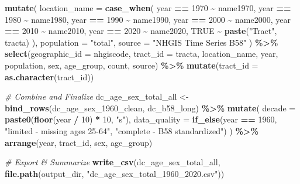 \documentclass[
]{article}
\newenvironment{Shaded}{\begin{snugshade}}{\end{snugshade}}
\newcommand{\AttributeTok}[1]{\textcolor[rgb]{0.13,0.29,0.53}{#1}}
\newcommand{\CommentTok}[1]{\textcolor[rgb]{0.56,0.35,0.01}{\textit{#1}}}
\newcommand{\ConstantTok}[1]{\textcolor[rgb]{0.56,0.35,0.01}{#1}}
\newcommand{\DecValTok}[1]{\textcolor[rgb]{0.00,0.00,0.81}{#1}}
\newcommand{\FunctionTok}[1]{\textcolor[rgb]{0.13,0.29,0.53}{\textbf{#1}}}
\newcommand{\NormalTok}[1]{#1}
\newcommand{\OtherTok}[1]{\textcolor[rgb]{0.56,0.35,0.01}{#1}}
\newcommand{\SpecialCharTok}[1]{\textcolor[rgb]{0.81,0.36,0.00}{\textbf{#1}}}
\newcommand{\StringTok}[1]{\textcolor[rgb]{0.31,0.60,0.02}{#1}}
\begin{document}
\begin{Shaded}
\begin{Highlighting}[]
  \FunctionTok{mutate}\NormalTok{(}
    \AttributeTok{location\_name =} \FunctionTok{case\_when}\NormalTok{(}
\NormalTok{      year }\SpecialCharTok{==} \DecValTok{1970} \SpecialCharTok{\textasciitilde{}}\NormalTok{ name1970,}
\NormalTok{      year }\SpecialCharTok{==} \DecValTok{1980} \SpecialCharTok{\textasciitilde{}}\NormalTok{ name1980,}
\NormalTok{      year }\SpecialCharTok{==} \DecValTok{1990} \SpecialCharTok{\textasciitilde{}}\NormalTok{ name1990,}
\NormalTok{      year }\SpecialCharTok{==} \DecValTok{2000} \SpecialCharTok{\textasciitilde{}}\NormalTok{ name2000,}
\NormalTok{      year }\SpecialCharTok{==} \DecValTok{2010} \SpecialCharTok{\textasciitilde{}}\NormalTok{ name2010,}
\NormalTok{      year }\SpecialCharTok{==} \DecValTok{2020} \SpecialCharTok{\textasciitilde{}}\NormalTok{ name2020,}
      \ConstantTok{TRUE} \SpecialCharTok{\textasciitilde{}} \FunctionTok{paste}\NormalTok{(}\StringTok{"Tract"}\NormalTok{, tracta)}
\NormalTok{    ),}
    \AttributeTok{population =} \StringTok{"total"}\NormalTok{,}
    \AttributeTok{source =} \StringTok{"NHGIS Time Series B58"}
\NormalTok{  ) }\SpecialCharTok{\%\textgreater{}\%}
  \FunctionTok{select}\NormalTok{(}\AttributeTok{geographic\_id =}\NormalTok{ nhgiscode, }\AttributeTok{tract\_id =}\NormalTok{ tracta, location\_name, year, population, sex, age\_group, count, source) }\SpecialCharTok{\%\textgreater{}\%}
  \FunctionTok{mutate}\NormalTok{(}\AttributeTok{tract\_id =} \FunctionTok{as.character}\NormalTok{(tract\_id))}

\CommentTok{\# Combine and Finalize }
\NormalTok{dc\_age\_sex\_total\_all }\OtherTok{\textless{}{-}} \FunctionTok{bind\_rows}\NormalTok{(dc\_age\_sex\_1960\_clean, dc\_b58\_long) }\SpecialCharTok{\%\textgreater{}\%}
  \FunctionTok{mutate}\NormalTok{(}
    \AttributeTok{decade =} \FunctionTok{paste0}\NormalTok{(}\FunctionTok{floor}\NormalTok{(year }\SpecialCharTok{/} \DecValTok{10}\NormalTok{) }\SpecialCharTok{*} \DecValTok{10}\NormalTok{, }\StringTok{"s"}\NormalTok{),}
    \AttributeTok{data\_quality =} \FunctionTok{if\_else}\NormalTok{(year }\SpecialCharTok{==} \DecValTok{1960}\NormalTok{, }\StringTok{"limited {-} missing ages 25{-}64"}\NormalTok{, }\StringTok{"complete {-} B58 standardized"}\NormalTok{)}
\NormalTok{  ) }\SpecialCharTok{\%\textgreater{}\%}
  \FunctionTok{arrange}\NormalTok{(year, tract\_id, sex, age\_group)}

\CommentTok{\# Export \& Summarize}
\FunctionTok{write\_csv}\NormalTok{(dc\_age\_sex\_total\_all, }\FunctionTok{file.path}\NormalTok{(output\_dir, }\StringTok{"dc\_age\_sex\_total\_1960\_2020.csv"}\NormalTok{))}


\end{Highlighting}
\end{Shaded}
\end{document}
